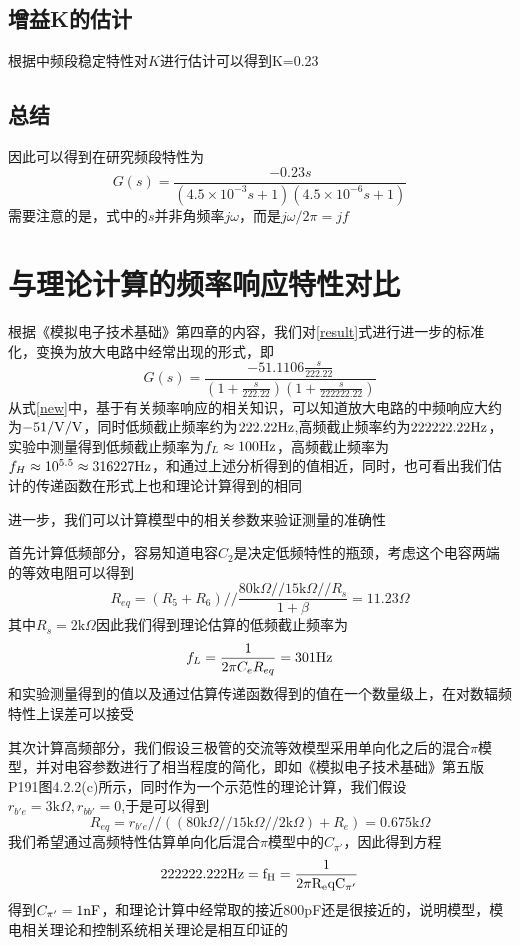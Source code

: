 \documentclass[UTF8,a4paper]{ctexart}
\begin{document}
\subsection{增益K的估计}
根据中频段稳定特性对$K$进行估计可以得到K=0.23
\subsection{总结}
因此可以得到在研究频段特性为
\begin{equation}
G(s)=\frac{-0.23s}{(4.5\times10^{-3}s+1)(4.5\times10^{-6}s+1)}
\label{result}
\end{equation}
需要注意的是，式中的$s$并非角频率$j\omega$，而是$j\omega/2\pi=jf$
\section{与理论计算的频率响应特性对比}
根据《模拟电子技术基础》第四章的内容，我们对\ref{result}式进行进一步的标准化，变换为放大电路中经常出现的形式，即
\begin{equation}
G(s)=\frac{-51.1106\frac{s}{222.22}}{(1+\frac{s}{222.22})(1+\frac{s}{222222.22})}
\label{new}
\end{equation}
从式\ref{new}中，基于有关频率响应的相关知识，可以知道放大电路的中频响应大约为$-51/\rm{V/V}$，同时低频截止频率约为$222.22\rm{Hz}$,高频截止频率约为$222222.22\rm{Hz}$，实验中测量得到低频截止频率为$f_L\approx100\rm{Hz}$，高频截止频率为$f_H\approx10^{5.5}\approx316227\rm{Hz}$，和通过上述分析得到的值相近，同时，也可看出我们估计的传递函数在形式上也和理论计算得到的相同

进一步，我们可以计算模型中的相关参数来验证测量的准确性

首先计算低频部分，容易知道电容$C_2$是决定低频特性的瓶颈，考虑这个电容两端的等效电阻可以得到
\begin{equation}
R_{eq}=(R_5+R_6) // \frac{80\mathrm{k}\Omega // 15 \mathrm{k}\Omega//R_s}{1+\beta} = 11.23\Omega
\end{equation}
其中$R_s=2\mathrm{k}\Omega$因此我们得到理论估算的低频截止频率为
\begin{equation}
f_L=\frac{1}{2\pi C_eR_{eq}}=301\rm{Hz}
\end{equation}
和实验测量得到的值以及通过估算传递函数得到的值在一个数量级上，在对数辐频特性上误差可以接受

其次计算高频部分，我们假设三极管的交流等效模型采用单向化之后的混合$\pi$模型，并对电容参数进行了相当程度的简化，即如《模拟电子技术基础》第五版P191图4.2.2(c)所示，同时作为一个示范性的理论计算，我们假设$r_{b'e}=3\mathrm{k}\Omega,r_{bb'}=0$,于是可以得到
\begin{equation}
R_{eq}=r_{b'e}//((80\mathrm{k}\Omega//15\mathrm{k}\Omega//2\mathrm{k}\Omega)+R_e)=0.675\mathrm{k}\Omega
\end{equation}
我们希望通过高频特性估算单向化后混合$\pi$模型中的$C_{\pi '}$，因此得到方程
\begin{equation}
222222.222\rm{Hz}=f_H=\frac{1}{2\pi R_eqC_{\pi '}}
\end{equation}
得到$C_{\pi '}=1\rm{nF}$，和理论计算中经常取的接近800pF还是很接近的，说明模型，模电相关理论和控制系统相关理论是相互印证的
\end{document}
